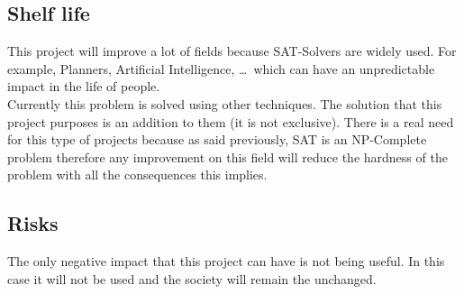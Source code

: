 \subsection{Shelf life}
This project will improve a lot of fields because SAT-Solvers are widely used. For example, Planners, Artificial Intelligence, \ldots \ which can have an unpredictable impact in the life of people.\\

Currently this problem is solved using other techniques. The solution that this project purposes is an addition to them (it is not exclusive). There is a real need for this type of projects because as said previously, SAT is an NP-Complete problem therefore any improvement on this field will reduce the hardness of the problem with all the consequences this implies.

\subsection{Risks}
The only negative impact that this project can have is not being useful. In this case it will not be used and the society will remain the unchanged.